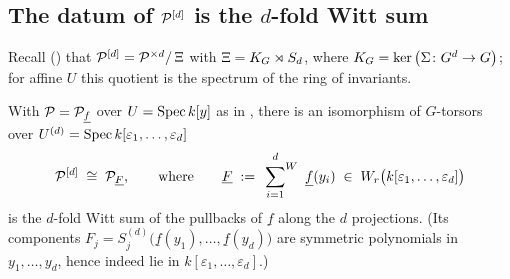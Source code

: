 \documentclass[11pt]{article}
\providecommand{\eps}{\varepsilon}                  %
\newcommand{\wv}[1]{\underline{#1}}                 %
\newcommand{\Wsum}{\sideset{}{^{W}}\sum}            %
\begin{document}
\subsection{The datum of \texorpdfstring{$\mathcal{P}^{[d]}$}{P[d]} is the \texorpdfstring{$d$}{d}-fold Witt sum}

Recall () that
$\mathcal{P}^{[d]}=\mathcal{P}^{\times d}/\,\Xi$ with $\Xi=K_{G}\rtimes S_d$, where
$K_{G}=\ker\big(\Sigma\colon G^d\to G\big)$; for affine $U$ this quotient is
the spectrum of the ring of invariants.

\begin{theorem}\label{thm:datum}
With $\cP=\cP_{\wv f}$ over $U=\operatorname{Spec} k[y]$ as in
, there is an isomorphism of $G$-torsors over
$U^{(d)}=\Spec k[\eps_1,\dots,\eps_d]$
\[
\cP^{[d]}\;\cong\;\cP_{\wv F},
\qquad\text{where}\qquad
\wv F\;:=\;\Wsum_{i=1}^{d}\ \wv f(y_i)\;\in\;W_r\big(k[\eps_1,\dots,\eps_d]\big)
\]
is the $d$-fold Witt sum of the pullbacks of $\wv f$ along the $d$
projections.  (Its components
$F_j=S^{(d)}_j\big(\wv f(y_1),\dots,\wv f(y_d)\big)$ are symmetric
polynomials in $y_1,\dots,y_d$, hence indeed lie in
$k[\eps_1,\dots,\eps_d]$.)
\end{theorem}
\end{document}
